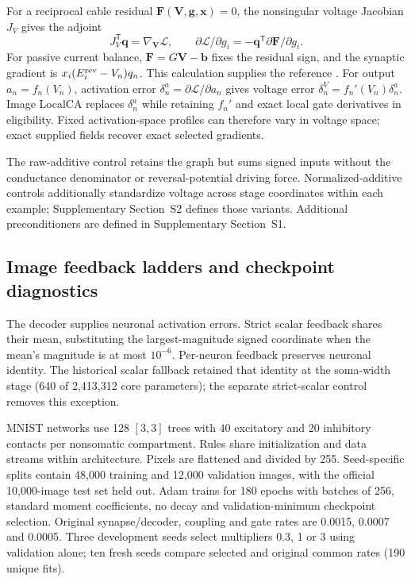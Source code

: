 \documentclass[11pt]{article}
\begin{document}
For a reciprocal cable residual $\bm F(\bm V,\bm g,\bm x)=0$, the nonsingular voltage Jacobian $J_V$ gives the adjoint
\begin{equation}
J_V^{\mathsf T}\bm q=\nabla_{\bm V}\mathcal L,
\qquad \partial\mathcal L/\partial g_i=-\bm q^{\mathsf T}\partial\bm F/\partial g_i.
\label{eq:generaladjoint}
\end{equation}
For passive current balance, $\bm F=G\bm V-\bm b$ fixes the residual sign, and the synaptic gradient is $x_i(E_i^{\rm rev}-V_n)q_n$. This calculation supplies the reference \citep{almeida1987asynchronous,pineda1987recurrent,schiess2016somatodendritic,bicknell2021synaptic}. For output $a_n=f_n(V_n)$, activation error $\delta^a_n=\partial\mathcal L/\partial a_n$ gives voltage error $\delta^V_n=f_n'(V_n)\delta^a_n$. Image LocalCA replaces $\delta^a_n$ while retaining $f_n'$ and exact local gate derivatives in eligibility. Fixed activation-space profiles can therefore vary in voltage space; exact supplied fields recover exact selected gradients.

The raw-additive control retains the graph but sums signed inputs without the conductance denominator or reversal-potential driving force. Normalized-additive controls additionally standardize voltage across stage coordinates within each example; Supplementary Section~S2 defines those variants. Additional preconditioners are defined in Supplementary Section~S1.


\subsection*{Image feedback ladders and checkpoint diagnostics}

The decoder supplies neuronal activation errors. Strict scalar feedback shares their mean, substituting the largest-magnitude signed coordinate when the mean's magnitude is at most $10^{-6}$. Per-neuron feedback preserves neuronal identity. The historical scalar fallback retained that identity at the soma-width stage (640 of 2,413,312 core parameters); the separate strict-scalar control removes this exception.

MNIST networks use 128 $[3,3]$ trees with 40 excitatory and 20 inhibitory contacts per nonsomatic compartment. Rules share initialization and data streams within architecture. Pixels are flattened and divided by 255. Seed-specific splits contain 48,000 training and 12,000 validation images, with the official 10,000-image test set held out. Adam trains for 180 epochs with batches of 256, standard moment coefficients, no decay and validation-minimum checkpoint selection. Original synapse/decoder, coupling and gate rates are 0.0015, 0.0007 and 0.0005. Three development seeds select multipliers 0.3, 1 or 3 using validation alone; ten fresh seeds compare selected and original common rates (190 unique fits).
\end{document}

